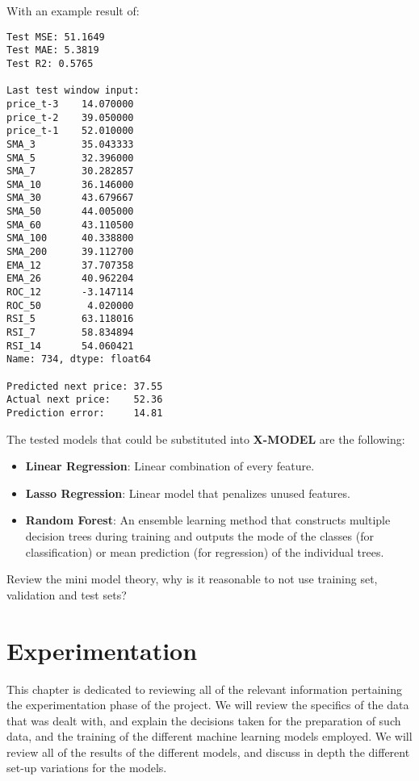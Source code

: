 \documentclass[12pt]{report} %
\begin{document}
With an example result of:
\begin{verbatim}
Test MSE: 51.1649
Test MAE: 5.3819
Test R2: 0.5765

Last test window input:
price_t-3    14.070000
price_t-2    39.050000
price_t-1    52.010000
SMA_3        35.043333
SMA_5        32.396000
SMA_7        30.282857
SMA_10       36.146000
SMA_30       43.679667
SMA_50       44.005000
SMA_60       43.110500
SMA_100      40.338800
SMA_200      39.112700
EMA_12       37.707358
EMA_26       40.962204
ROC_12       -3.147114
ROC_50        4.020000
RSI_5        63.118016
RSI_7        58.834894
RSI_14       54.060421
Name: 734, dtype: float64

Predicted next price: 37.55
Actual next price:    52.36
Prediction error:     14.81
\end{verbatim}





The tested models that could be substituted into \textbf{X-MODEL} are the following:
\begin{itemize}
    \item \textbf{Linear Regression}: Linear combination of every feature.
    \item \textbf{Lasso Regression}: Linear model that penalizes unused features.
    \item \textbf{Random Forest}: An ensemble learning method that constructs multiple decision trees during training and outputs the mode of the classes (for classification) or mean prediction (for regression) of the individual trees.
\end{itemize}

Review the mini model theory, why is it reasonable to not use training set, validation and test sets?




\chapter{Experimentation}
This chapter is dedicated to reviewing all of the relevant information pertaining the experimentation phase of the project. We will review the specifics of the data that was dealt with, and explain the decisions taken for the preparation of such data, and the training of the different machine learning models employed. We will review all of the results of the different models, and discuss in depth the different set-up variations for the models.
\end{document}
